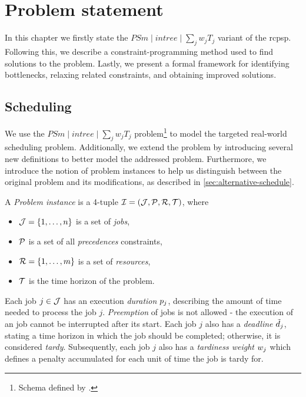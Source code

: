 \chapter{Problem statement} \label{chap:problem-statement}

In this chapter we firstly state the $PSm \;|\; intree \;|\; \sum_{j} w_j T_j$ variant of the \ac{rcpsp}.
Following this, we describe a constraint-programming method used to find solutions to the problem.
Lastly, we present a formal framework for identifying bottlenecks, relaxing related constraints,
and obtaining improved solutions.

\section{Scheduling} \label{sec:scheduling}

We use the $PSm \;|\; intree \;|\; \sum_{j} w_j T_j$ problem\footnote{Schema defined by \citet{BRUCKER1999}.}
to model the targeted real-world scheduling problem.
Additionally, we extend the problem by introducing several new definitions to better model the addressed problem.
Furthermore, we  introduce the notion of problem instances to help us distinguish between the original problem
and its modifications, as described in \cref{sec:alternative-schedule}.

A \emph{Problem instance} is a 4-tuple $\mathcal{I} = (\mathcal{J}, \mathcal{P}, \mathcal{R}, \mathcal{T})$,
where

\begin{itemize}
    \item $\mathcal{J} = \{1, \dots, n\}$ is a set of \emph{jobs},
    \item $\mathcal{P}$ is a set of all \emph{precedences} constraints,
    \item $\mathcal{R} = \{1, \dots, m\}$ is a set of \emph{resources},
    \item $\mathcal{T}$ is the time horizon of the problem.
\end{itemize}

Each job $j \in \mathcal{J}$ has an execution \emph{duration} $p_{j}$,
describing the amount of time needed to process the job $j$.
\emph{Preemption} of jobs is not allowed
- the execution of an job cannot be interrupted after its start.
Each job $j$ also has a \emph{deadline} $\tilde{d}_{j}$,
stating a time horizon in which the job should be completed;
otherwise, it is considered \emph{tardy}.
Subsequently, each job $j$ also has a \emph{tardiness weight} $w_{j}$
which defines a penalty accumulated for each unit of time the job is tardy for.

